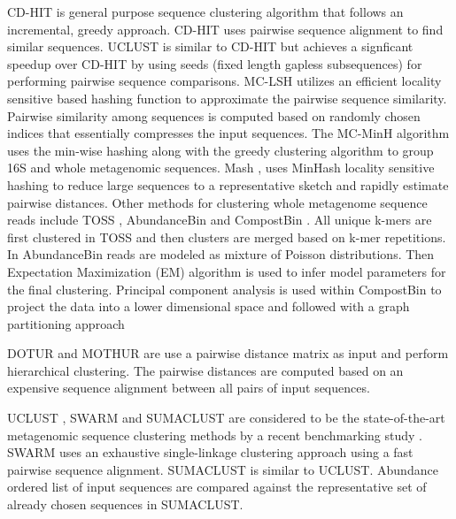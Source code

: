 \documentclass[10pt, conference, compsocconf]{IEEEtran}
\begin{document}
CD-HIT \cite{XXX} is general purpose sequence clustering algorithm that 
follows an incremental, greedy approach. CD-HIT uses pairwise sequence alignment 
to find similar sequences. UCLUST \cite{XXX} is similar to CD-HIT but achieves 
a signficant speedup over CD-HIT by using 
seeds (fixed length gapless subsequences) 
for performing pairwise sequence comparisons. 
%
MC-LSH \cite{MARMetaLSH} utilizes an efficient 
locality sensitive based hashing function 
to approximate the pairwise sequence similarity. Pairwise similarity 
among sequences is computed based on 
randomly chosen indices that essentially compresses the 
input sequences. The 
MC-MinH \cite{MARMcMinH} algorithm uses 
the min-wise \cite{MARMinWise} hashing along with the 
greedy clustering algorithm to group
16S and whole metagenomic sequences. Mash \cite{MAROtherMinH}, uses 
MinHash locality sensitive hashing to 
reduce large sequences to a representative sketch 
and rapidly estimate pairwise distances. Other
methods for clustering whole metagenome sequence
reads include TOSS \cite{MARToss}, AbundanceBin \cite{MARAbundant}
and CompostBin \cite{MARCompost}. All unique k-mers are 
first clustered in TOSS and then 
clusters are merged based on k-mer repetitions. In AbundanceBin 
reads are modeled as mixture of Poisson distributions. Then 
Expectation Maximization (EM) algorithm is used to 
infer model parameters for the 
final clustering. Principal component analysis is used within
CompostBin to project the data into a 
lower dimensional space and followed with a graph partitioning 
approach %
%

DOTUR \cite{XXX} and   
MOTHUR \cite{YYY} are 
use a pairwise distance matrix as input and 
perform hierarchical clustering.
%
The pairwise distances are
computed based on an expensive 
sequence alignment 
 between all pairs of input sequences.



UCLUST \cite{xx}, SWARM \cite{MARSwarm}\cite{MARSwarm2} and 
SUMACLUST \cite{MARSumaclust}  are considered to be the state-of-the-art 
metagenomic sequence 
clustering methods by a recent benchmarking study \cite{MARDeNovo}. 
%
SWARM uses an  exhaustive single-linkage 
clustering approach using a fast pairwise 
sequence alignment. SUMACLUST is similar to UCLUST. Abundance ordered 
list of input sequences are compared against the 
representative set of already chosen sequences in SUMACLUST. 
\end{document}
